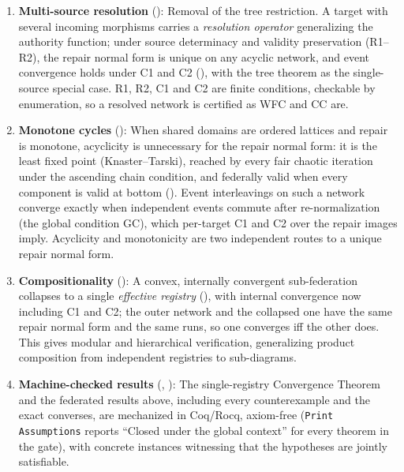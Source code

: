 \documentclass[11pt,a4paper]{article}
\theoremstyle{plain}
\theoremstyle{definition}
\theoremstyle{remark}
\renewcommand{\_}{\textunderscore\allowbreak}
\begin{document}
\begin{enumerate}[leftmargin=*,nosep]
  every event interleaving applied to normalized states converges
  (); the same equations at reachable witnesses are
  the exact condition.  Necessity of acyclicity, M1, C1 and C2 is shown by
  counterexample.
\item \textbf{Multi-source resolution} (): Removal of the
  tree restriction.  A target with several incoming morphisms carries a
  \emph{resolution operator} generalizing the authority function; under source
  determinacy and validity preservation (R1--R2), the repair normal form is
  unique on any acyclic network, and event convergence holds under C1 and C2
  (), with the tree theorem as the
  single-source special case.  R1, R2, C1 and C2 are finite conditions,
  checkable by enumeration, so a resolved network is certified as WFC and CC
  are.
\item \textbf{Monotone cycles} (): When shared domains are
  ordered lattices and repair is monotone, acyclicity is unnecessary for the
  repair normal form: it is the least fixed point (Knaster--Tarski), reached by
  every fair chaotic iteration under the ascending chain condition, and
  federally valid when every component is valid at bottom
  ().  Event interleavings on such a network converge
  exactly when independent events commute after re-normalization (the global
  condition GC), which per-target C1 and C2 over the repair images imply.
  Acyclicity and monotonicity are two independent routes to a unique repair
  normal form.
\item \textbf{Compositionality} (): A convex,
  internally convergent sub-federation collapses to a single \emph{effective
  registry} (), with internal convergence now including C1
  and C2; the outer network and the collapsed one have the same repair normal
  form and the same runs, so one converges iff the other does.  This gives
  modular and hierarchical verification, generalizing product composition from
  independent registries to sub-diagrams.
\item \textbf{Machine-checked results} (,
  ): The single-registry Convergence Theorem and the
  federated results above, including every counterexample and the exact
  converses, are mechanized in Coq/Rocq, axiom-free (\texttt{Print
  Assumptions} reports ``Closed under the global context'' for every theorem in
  the gate), with concrete instances witnessing that the hypotheses are jointly
  satisfiable.
\end{enumerate}
\end{document}

